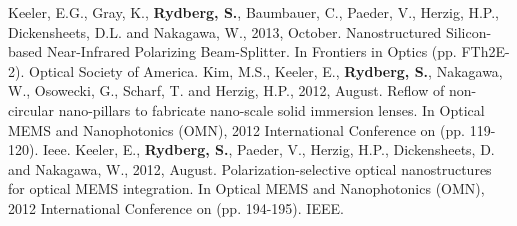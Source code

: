 \begin{cvcitations}
  \cvcite
    {Keeler, E.G., Gray, K., \textbf{Rydberg, S.}, Baumbauer, C., Paeder, V., Herzig, H.P., Dickensheets, D.L. and Nakagawa, W., 2013, October. Nanostructured Silicon-based Near-Infrared Polarizing Beam-Splitter. In Frontiers in Optics (pp. FTh2E-2). Optical Society of America.} %
  \cvcite
    {Kim, M.S., Keeler, E., \textbf{Rydberg, S.}, Nakagawa, W., Osowecki, G., Scharf, T. and Herzig, H.P., 2012, August. Reflow of non-circular nano-pillars to fabricate nano-scale solid immersion lenses. In Optical MEMS and Nanophotonics (OMN), 2012 International Conference on (pp. 119-120). Ieee.} %
  \cvcite
    {Keeler, E., \textbf{Rydberg, S.}, Paeder, V., Herzig, H.P., Dickensheets, D. and Nakagawa, W., 2012, August. Polarization-selective optical nanostructures for optical MEMS integration. In Optical MEMS and Nanophotonics (OMN), 2012 International Conference on (pp. 194-195). IEEE.} %
\end{cvcitations}

